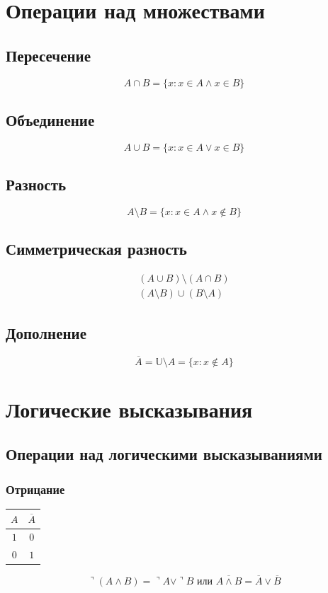 \documentclass{article}
\begin{document}
\section{Операции над множествами}

\subsection{Пересечение}
\[
    A \cap B = \{x: x \in A \wedge x \in B\}
\]


\subsection{Объединение}
\[
    A \cup B = \{x: x \in A \vee x \in B\}
\]


\subsection{Разность}
\[
    A \setminus B = \{x: x \in A \wedge x \notin B\}
\] 


\subsection{Симметрическая разность}
\begin{gather*}
    (A \cup B) \setminus (A \cap B) \\
    (A \setminus B) \cup (B \setminus A)
\end{gather*}


\subsection{Дополнение}
\[
    \overline{A} = \mathbb{U} \setminus A = \{x: x \notin A\}
\]



\section{Логические высказывания}

\subsection{Операции над логическими высказываниями}

\subsubsection{Отрицание}
\begin{tabular}{c|c}
    $A$ & $\overline{A}$ \\
    \hline
    $1$ & $0$ \\
    $0$ & $1$
\end{tabular}
\[
    \urcorner (A \wedge B) = \urcorner A \vee \urcorner B \text{ или } \overline{A \wedge B} = \overline{A} \vee \overline{B}
\]
\end{document}
